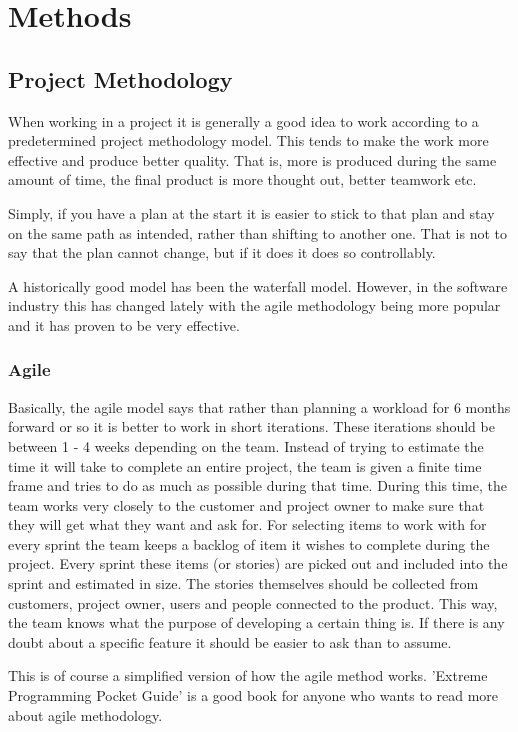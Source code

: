 \section{Methods}


\subsection{Project Methodology}
When working in a project it is generally a good idea to work according to a predetermined project methodology model. This tends to make the work more effective and produce better quality. That is, more is produced during the same amount of time, the final product is more thought out, better teamwork etc.

Simply, if you have a plan at the start it is easier to stick to that plan and stay on the same path as intended, rather than shifting to another one. That is not to say that the plan cannot change, but if it does it does so controllably.

A historically good model has been the waterfall model. However, in the software industry this has changed lately with the agile methodology being more popular and it has proven to be very effective.

\subsubsection{Agile}
Basically, the agile model says that rather than planning a workload for 6 months forward or so it is better to work in short iterations. These iterations should be between 1 - 4 weeks depending on the team.
Instead of trying to estimate the time it will take to complete an entire project, the team is given a finite time frame and tries to do as much as possible during that time. During this time, the team works very closely to the customer and project owner to make sure that they will get what they want and ask for.
For selecting items to work with for every sprint the team keeps a backlog of item it wishes to complete during the project. Every sprint these items (or stories) are picked out and included into the sprint and estimated in size. The stories themselves should be collected from customers, project owner, users and people connected to the product. This way, the team knows what the purpose of developing a certain thing is. If there is any doubt about a specific feature it should be easier to ask than to assume.

This is of course a simplified version of how the agile method works. 'Extreme Programming Pocket Guide' is a good book for anyone who wants to read more about agile methodology.

